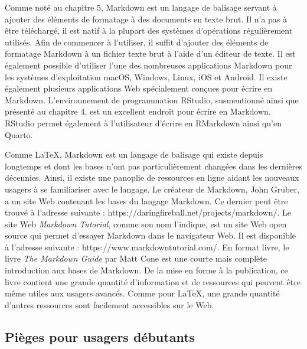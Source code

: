 \documentclass[
  letterpaper,
]{scrbook}
\begin{document}
Comme noté au chapitre 5, Markdown est un langage de balisage servant à
ajouter des éléments de formatage à des documents en texte brut. Il n'a
pas à être téléchargé, il est natif à la plupart des systèmes
d'opérations régulièrement utilisés. Afin de commencer à l'utiliser, il
suffit d'ajouter des éléments de formatage Markdown à un fichier texte
brut à l'aide d'un éditeur de texte. Il est également possible
d'utiliser l'une des nombreuses applications Markdown pour les systèmes
d'exploitation macOS, Windows, Linux, iOS et Android. Il existe
également plusieurs applications Web spécialement conçues pour écrire en
Markdown. L'environnement de programmation RStudio, susmentionné ainsi
que présenté au chapitre 4, est un excellent endroit pour écrire en
Markdown. RStudio permet également à l'utilisateur d'écrire en RMarkdown
ainsi qu'en Quarto.

Comme \LaTeX, Markdown est un langage de balisage qui existe depuis
longtemps et dont les bases n'ont pas particulièrement changées dans les
dernières décennies. Ainsi, il existe une panoplie de ressources en
ligne aidant les nouveaux usagers à se familiariser avec le langage. Le
créateur de Markdown, John Gruber, a un site Web contenant les bases du
langage Markdown. Ce dernier peut être trouvé à l'adresse suivante :
https://daringfireball.net/projects/markdown/. Le site Web
\emph{Markdown Tutorial}, comme son nom l'indique, est un site Web open
source qui permet d'essayer Markdown dans le navigateur Web. Il est
disponible à l'adresse suivante : https://www.markdowntutorial.com/. En
format livre, le livre \emph{The Markdown Guide} par Matt Cone est une
courte mais complète introduction aux bases de Markdown. De la mise en
forme à la publication, ce livre contient une grande quantité
d'information et de ressources qui peuvent être même utiles aux usagers
avancés. Comme pour \LaTeX, une grande quantité d'autres ressources sont
facilement accessibles sur le Web.

\hypertarget{piuxe8ges-pour-usagers-duxe9butants}{%
\subsection{Pièges pour usagers
débutants}\label{piuxe8ges-pour-usagers-duxe9butants}}
\end{document}

